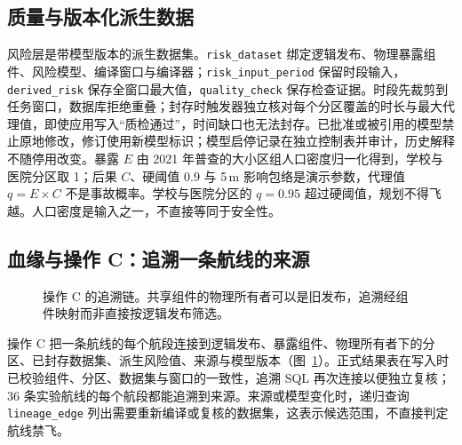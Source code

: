 \documentclass[a4paper,11pt,UTF8]{ctexart}
\begin{document}
\subsection{质量与版本化派生数据}

风险层是带模型版本的派生数据集。\texttt{risk\_dataset} 绑定逻辑发布、物理暴露组件、风险模型、编译窗口与编译器；\texttt{risk\_input\_period} 保留时段输入，\texttt{derived\_risk} 保存全窗口最大值，\texttt{quality\_check} 保存检查证据。时段先裁剪到任务窗口，数据库拒绝重叠；封存时触发器独立核对每个分区覆盖的时长与最大代理值，即使应用写入“质检通过”，时间缺口也无法封存。已批准或被引用的模型禁止原地修改，修订使用新模型标识；模型启停记录在独立控制表并审计，历史解释不随停用改变。暴露 $E$ 由 2021 年普查的大小区组人口密度归一化得到，学校与医院分区取 1；后果 $C$、硬阈值 0.9 与 5\,m 影响包络是演示参数，代理值 $q=E\times C$ 不是事故概率。学校与医院分区的 $q=0.95$ 超过硬阈值，规划不得飞越。人口密度是输入之一，不直接等同于安全性。

\subsection{血缘与操作 C：追溯一条航线的来源}

\begin{figure}[htbp]\centering
{}
\caption{操作 C 的追溯链。共享组件的物理所有者可以是旧发布，追溯经组件映射而非直接按逻辑发布筛选。}\label{fig:trace}
\end{figure}

操作 C 把一条航线的每个航段连接到逻辑发布、暴露组件、物理所有者下的分区、已封存数据集、派生风险值、来源与模型版本（图~\ref{fig:trace}）。正式结果表在写入时已校验组件、分区、数据集与窗口的一致性，追溯 SQL 再次连接以便独立复核；36 条实验航线的每个航段都能追溯到来源。来源或模型变化时，递归查询 \texttt{lineage\_edge} 列出需要重新编译或复核的数据集，这表示候选范围，不直接判定航线禁飞。
\end{document}
